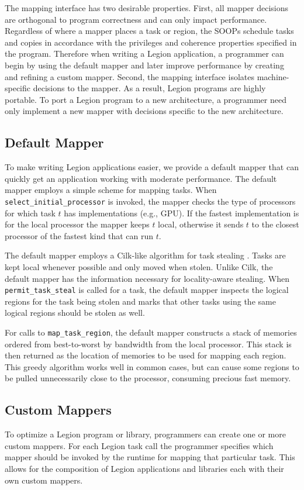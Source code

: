 The mapping interface has two desirable properties.  First, all mapper
decisions are orthogonal to program correctness and can only impact
performance.  Regardless of where a mapper places a task or region,
the SOOPs schedule tasks and copies in accordance with the privileges
and coherence properties specified in the program.  Therefore when
writing a Legion application, a programmer can begin by using the
default mapper and later improve performance by creating and refining a custom mapper.
Second, the mapping interface isolates machine-specific decisions
to the mapper.  As a result, Legion programs are highly
portable.  To port a Legion program to a new architecture, a programmer need only
implement a new mapper with decisions specific to the new architecture. 

\subsection{Default Mapper}
\label{sec:defmapper}
To make writing Legion applications easier, we provide a default
mapper that can quickly get an application working
with moderate performance.  The default mapper employs a
simple scheme for mapping tasks.  When {\tt
select\_initial\_processor} is invoked, the mapper
checks the type of processors for which task $t$ has
implementations (e.g., GPU).  If the fastest implementation is for the
local processor the mapper keeps $t$ local, otherwise
it sends $t$ to the closest processor of the fastest kind that can run
$t$.


The default mapper employs a Cilk-like algorithm for task
stealing \cite{CILK95}.  Tasks are kept local 
whenever possible and only moved when stolen.  Unlike Cilk, the
default mapper has the information necessary for locality-aware
stealing.  When {\tt permit\_task\_steal} is called for a task, the
default mapper inspects the logical regions for the task being stolen
and marks that other tasks using the same logical regions should
be stolen as well.

For calls to {\tt map\_task\_region}, the default mapper constructs a stack of memories ordered from best-to-worst
by bandwidth from the local processor.  This stack is then returned as the location of memories to be used for
mapping each region.  This greedy algorithm works well in common cases, but can cause some 
regions to be pulled unnecessarily close to the processor, consuming precious fast memory.

\subsection{Custom Mappers}
\label{sec:custommap}
To optimize a Legion program or library, programmers can create one or more custom mappers.  
For each Legion task call the programmer specifies which mapper should be invoked by the runtime for
mapping that particular task.  This allows for the composition of Legion applications and libraries
each with their own custom mappers.

